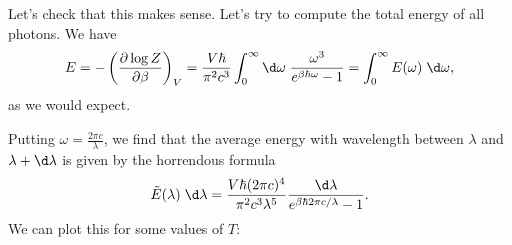 \documentclass[a4paper]{article}
\begin{document}
Let's check that this makes sense. Let's try to compute the total energy of all photons. We have
\[
  E = -\left(\frac{\partial \log Z}{\partial \beta}\right)_V = \frac{V \hbar}{\pi^2 c^3}\int_0^\infty \d \omega\; \frac{\omega^3}{e^{\beta \hbar \omega} - 1} = \int_0^\infty E(\omega) \;\d \omega,
\]
as we would expect.

Putting $\omega = \frac{2\pi c}{\lambda}$, we find that the average energy with wavelength between $\lambda$ and $\lambda + \d \lambda$ is given by the horrendous formula
\[
  \tilde{E} (\lambda) \;\d \lambda = \frac{V \hbar (2\pi c)^4}{\pi^2 c^3 \lambda^5} \frac{\d \lambda}{e^{\beta \hbar 2 \pi c/\lambda} - 1}.
\]
We can plot this for some values of $T$:
\begin{center}
\end{center}
\end{document}
